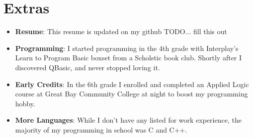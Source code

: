 \documentclass[letterpaper,11pt]{article}
\newcommand{\resumeItem}[2]{
  \item\small{
    \textbf{#1}{: #2 \vspace{-2pt}}
  }
}
\newcommand{\resumeSubItem}[2]{\resumeItem{#1}{#2}\vspace{-4pt}}
\newcommand{\resumeSubHeadingListStart}{\begin{itemize}[leftmargin=*]}
\newcommand{\resumeSubHeadingListEnd}{\end{itemize}}
\begin{document}
\section{Extras}
  \resumeSubHeadingListStart
    \resumeSubItem{Resume}
      {This resume is updated on my github TODO... fill this out}
    \resumeSubItem{Programming}
      {I started programming in the 4th grade with Interplay's Learn to Program Basic boxset from a Scholstic book club. Shortly after I discovered QBasic, and never stopped loving it.}
    \resumeSubItem{Early Credits}
      {In the 6th grade I enrolled and completed an Applied Logic course at Great Bay Community College at night to boost my programming hobby.}
    \resumeSubItem{More Languages}
      {While I don't have any listed for work experience, the majority of my programming in school was C and C++.}
  \resumeSubHeadingListEnd

%


\end{document}
